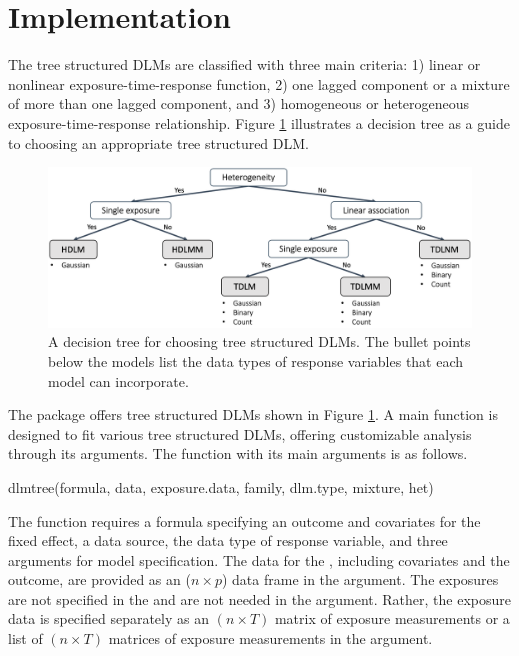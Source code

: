 \section{Implementation} \label{sec:imp}
The tree structured DLMs are classified with three main criteria: 1) linear or nonlinear exposure-time-response function, 2) one lagged component or a mixture of more than one lagged component, and 3) homogeneous or heterogeneous exposure-time-response relationship. Figure \ref{fig:decisiontree} illustrates a decision tree as a guide to choosing an appropriate tree structured DLM.

\begin{figure}[ht]
    \centering
    \includegraphics[width = \textwidth]{images/decisiontree.png}
        \caption{A decision tree for choosing tree structured DLMs. The bullet points below the models list the data types of response variables that each model can incorporate.}
    \label{fig:decisiontree}
\end{figure}

The  package offers tree structured DLMs shown in Figure \ref{fig:decisiontree}. A main function  is designed to fit various tree structured DLMs, offering customizable analysis through its arguments. The function  with its main arguments is as follows.

\begin{example}
dlmtree(formula, data, exposure.data, family, dlm.type, mixture, het)
\end{example}
The function requires a formula specifying an outcome and covariates for the fixed effect, a data source, the data type of response variable, and three arguments for model specification. The data for the , including covariates and the outcome, are provided as an ($n\times p$) data frame in the  argument. The exposures are not specified in the  and are not needed in the  argument. Rather, the exposure data is specified separately as an $(n \times T)$ matrix of exposure measurements or a list of $(n \times T)$ matrices of exposure measurements in the  argument.

